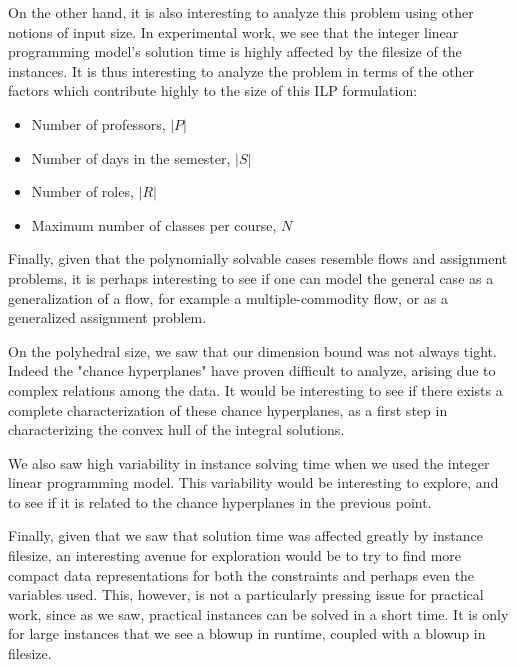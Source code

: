On the other hand, it is also interesting to analyze this problem using other notions of input size. In experimental work, we see that the integer linear programming model's solution time is highly affected by the filesize of the instances. It is thus interesting to analyze the problem in terms of the other factors which contribute highly to the size of this ILP formulation:

\begin{itemize}
\item Number of professors, $|P|$
\item Number of days in the semester, $|S|$
\item Number of roles, $|R|$
\item Maximum number of classes per course, $N$
\end{itemize}

Finally, given that the polynomially solvable cases resemble flows and assignment problems, it is perhaps interesting to see if one can model the general case as a generalization of a flow, for example a multiple-commodity flow, or as a generalized assignment problem.

On the polyhedral size, we saw that our dimension bound was not always tight. Indeed the "chance hyperplanes" have proven difficult to analyze, arising due to complex relations among the data. It would be interesting to see if there exists a complete characterization of these chance hyperplanes, as a first step in characterizing the convex hull of the integral solutions.

We also saw high variability in instance solving time when we used the integer linear programming model. This variability would be interesting to explore, and to see if it is related to the chance hyperplanes in the previous point.

Finally, given that we saw that solution time was affected greatly by instance filesize, an interesting avenue for exploration would be to try to find more compact data representations for both the constraints and perhaps even the variables used. This, however, is not a particularly pressing issue for practical work, since as we saw, practical instances can be solved in a short time. It is only for large instances that we see a blowup in runtime, coupled with a blowup in filesize.
